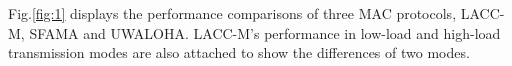 \documentclass[conference]{IEEEtran}
\begin{document}
Fig.\ref{fig:1} displays the performance comparisons of three MAC protocols, LACC-M, SFAMA and UWALOHA. LACC-M's performance in low-load and high-load transmission modes are also attached to show the differences of two modes.
\begin{figure}[!h]
	\centering                                                     {}
\end{figure}
\end{document}
